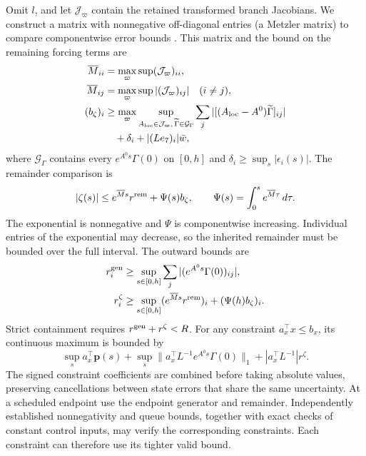 \documentclass[preprint,12pt]{elsarticle}
\theoremstyle{definition}
\theoremstyle{plain}
\theoremstyle{definition}
\theoremstyle{plain}
\begin{document}
Omit $l$, and let $\mathcal J_\varpi$ contain the retained transformed branch
Jacobians. We construct a matrix with nonnegative off-diagonal entries (a Metzler
matrix) to compare componentwise error bounds \cite{farina2000positive}. This matrix and the bound
on the remaining forcing terms are
\begin{equation}
 \begin{aligned}
 \overline{M}_{ii}&=\max_\varpi\sup(\mathcal J_\varpi)_{ii},\\
 \overline{M}_{ij}&=\max_\varpi\sup|(\mathcal J_\varpi)_{ij}|\quad(i\ne j),\\
 (b_\zeta)_i&\ge\max_\varpi\sup_{A_{\rm loc}\in\mathcal J_\varpi,\,\widetilde\Gamma\in\mathcal G_\Gamma}
                  \sum_j|[(A_{\rm loc}-A^0)\widetilde\Gamma]_{ij}|\\
             &\hspace{1em}+\delta_i+|(Le_7)_i|\bar w,
 \end{aligned}
 \label{eq:structure-metzler}
\end{equation}
where $\mathcal G_\Gamma$ contains every $e^{A^0s}\Gamma(0)$ on $[0,h]$ and
$\delta_i\ge\sup_s|\epsilon_i(s)|$. The remainder comparison is
\begin{equation}
 |\zeta(s)|\le e^{\overline{M}s} r^{\rm rem}+\Psi(s)b_\zeta,
 \qquad \Psi(s)=\int_0^s e^{\overline{M}\tau}\,d\tau.
 \label{eq:structure-remainder-bound}
\end{equation}
The exponential is nonnegative and $\Psi$ is componentwise increasing.
Individual entries of the exponential may decrease, so the inherited
remainder must be bounded over the full interval. The outward bounds are
\begin{equation}
 \begin{aligned}
 r_i^{\rm gen}&\ge\sup_{s\in[0,h]}\sum_j|(e^{A^0s}\Gamma(0))_{ij}|,\\
 r_i^\zeta&\ge\sup_{s\in[0,h]}(e^{\overline{M}s} r^{\rm rem})_i
                            +(\Psi(h)b_\zeta)_i.
 \end{aligned}
 \label{eq:structure-continuous-radii}
\end{equation}
Strict containment requires $r^{\rm gen}+r^\zeta<R$. For any constraint
$a_x^\top x\le b_x$, its continuous maximum is bounded by
\begin{equation}
 \sup_s a_x^\top \mathbf{p}(s)+
 \sup_s\|a_x^\top L^{-1}e^{A^0s}\Gamma(0)\|_1+
 |a_x^\top L^{-1}|r^\zeta.
 \label{eq:structure-signed-output}
\end{equation}
The signed constraint coefficients are combined before taking absolute
values, preserving cancellations between state errors that share the same uncertainty. At a
scheduled endpoint use the endpoint generator and remainder. Independently established nonnegativity and queue bounds, together with
exact checks of constant control inputs, may verify the corresponding
constraints. Each constraint can therefore use its tighter valid bound.
\end{document}
